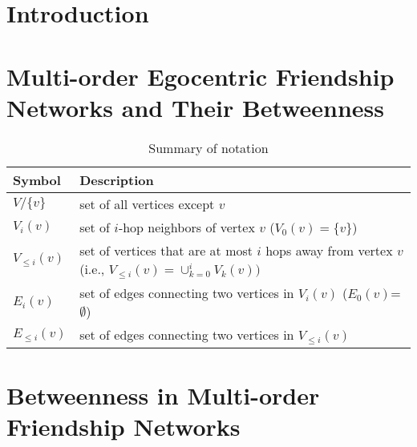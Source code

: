 \documentclass[preprint,12pt,authoryear]{elsarticle}
\newcommand{\V}[2]{V_{#2}({#1})}
\newcommand{\LV}[2]{V_{\le #2}({#1})}
\newcommand{\E}[2]{E_{#2}({#1})}
\newcommand{\LE}[2]{E_{\le #2}({#1})}
\theoremstyle{definition}
\begin{document}

\section{Introduction}\label{sec:introduction}

\section{Multi-order Egocentric Friendship Networks and Their Betweenness}\label{sec:multi-order-friendship-network}

\begin{table}[t]
\captionsetup[subfigure]{aboveskip=-2pt, belowskip=-1pt}
\center
\caption{Summary of notation}\label{table:symbols}
\small
    \begin{tabular}{| p{1.2cm} | p{10cm} |}
        \hline
        Symbol & Description \\
        \hline
        \hline
        $V/\{v\}$ & set of all vertices except $v$ \\        
        $\V{v}{i}$ & set of $i$-hop neighbors of vertex $v$ ($\V{v}{0} = \{ v \}$)\\
        $\LV{v}{i}$ & set of vertices that are at most $i$ hops away from vertex $v$ (i.e., $\LV{v}{i} = \cup_{k = 0}^{i} \V{v}{k}) $\\
        $\E{v}{i}$ & set of edges connecting two vertices in $\V{v}{i}$ ($\E{v}{0}$=$\emptyset$)\\
        $\LE{v}{i}$ & set of edges connecting two vertices in $\LV{v}{i}$\\
        \hline
    \end{tabular}
\end{table}

\section{Betweenness in Multi-order Friendship Networks}\label{sec:betweenness}
\end{document}
